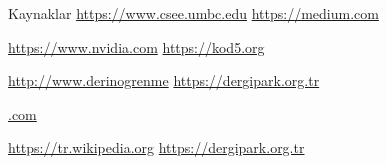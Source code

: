 \documentclass{beamer}                                                                                          %
\begin{document}
    \begin{frame}{Kaynaklar}
        \color{myred1} \color{black} \href{https://www.csee.umbc.edu/courses/471/papers/turing.pdf}{https://www.csee.umbc.edu}\hspace{21}
        \color{myred1} \color{black} \href{https://medium.com/@fahrettinf/4-1-1-yapay-sinir-a\%C4\%9Flar\%C4\%B1-86f0440f85c2}{https://medium.com}\par\vspace{15}
        
        
        \color{myred1} \color{black} \href{https://www.nvidia.com/en-us/deep-learning-ai}{https://www.nvidia.com}\hspace{38}
        \color{myred1} \color{black} \href{https://kod5.org/yapay-sinir-aglari-ysa-nedir/}{https://kod5.org}\par \vspace{15}
        
        
        \color{myred1} \color{black} \href{http://www.derinogrenme.com/2017/03/04/yapay-sinir-aglari/}{http://www.derinogrenme}\hspace{30}
        \color{myred1} \color{black} \href{https://dergipark.org.tr/en/download/article-file/165799}{https://dergipark.org.tr}\par
        \hspace{12}\href{http://www.derinogrenme.com/2017/03/04/yapay-sinir-aglari/}{.com}
        
        
        \color{myred1} \color{black} \href{https://tr.wikipedia.org/wiki/Yapay\_sinir\_a\%C4\%9Flar\%C4\%B1}{https://tr.wikipedia.org}\hspace{42}
        \color{myred1} \color{black} \href{https://dergipark.org.tr/en/download/article-file/66549}{https://dergipark.org.tr}\par\vspace{15}
        

\end{frame}
\end{document}
